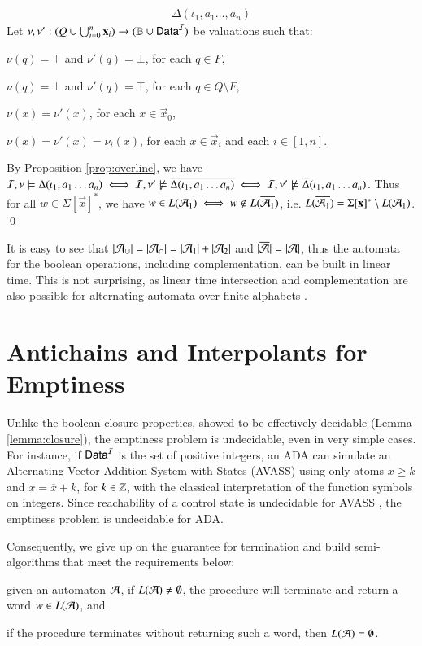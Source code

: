 \documentclass[10pt,conference,letterpaper,twocolumn]{IEEEtran}
\begin{document}
{\[\begin{array}{lcl}
  \overline{\Delta(\iota_1,a_1\ldots,a_n)}
  \end{array}\]
  Let $\nu,\nu' : (Q \cup \bigcup_{i=0}^n\mathbf x_i) \rightarrow (\mathbb{B}
  \cup \mathsf{Data}^{\mathcal{I}})$ be valuations such that: \begin{compactitem}
  \item $\nu(q) = \top$ and $\nu'(q) = \bot$, for each $q \in F$, 
  \item $\nu(q) = \bot$ and $\nu'(q) = \top$, for each $q \in Q \setminus F$, 
  \item $\nu(x) = \nu'(x)$, for each $x \in \vec{x}_0$, 
  \item $\nu(x) = \nu'(x) = \nu_i(x)$, for each $x \in \vec{x}_i$ and each $i
    \in [1,n]$.
  \end{compactitem}
  By Proposition \ref{prop:overline}, we have $\mathcal{I},\nu \models
  \Delta(\iota_1,a_1 \ldots a_n) \iff \mathcal{I},\nu' \not\models
  \overline{\Delta(\iota_1,a_1 \ldots a_n)} \iff \mathcal{I},\nu' \not\models
  \overline{\Delta}(\iota_1,a_1 \ldots a_n)$. Thus for all $w \in
  \Sigma[\vec{x}]^*$, we have $w \in L(\mathcal{A}_1) \iff w \not\in
  L(\overline{\mathcal{A}_1})$, i.e. $L(\overline{\mathcal{A}_1}) = \Sigma[\mathbf x]^*
  \setminus L(\mathcal{A}_1)$. \qed}

It is easy to see that ${|{\mathcal{A}_\cup}|} = {|{\mathcal{A}_\cap}|} = {|{\mathcal{A}_1}|} +
{|{\mathcal{A}_2}|}$ and ${|{\overline{\mathcal{A}}}|} = {|{\mathcal{A}}|}$, thus the automata
for the boolean operations, including complementation, can be built in
linear time. This is not surprising, as linear time intersection and
complementation are also possible for alternating automata over finite
alphabets \cite{ChandraKozenStockmeyer81}.

\section{Antichains and Interpolants for Emptiness}

Unlike the boolean closure properties, showed to be effectively
decidable (Lemma \ref{lemma:closure}), the emptiness problem is
undecidable, even in very simple cases. For instance, if $\mathsf{Data}^{\mathcal{I}}$ is
the set of positive integers, an ADA can simulate an Alternating
Vector Addition System with States (AVASS) \cite{LazicSchmitz14} using
only atoms $x \geq k$ and $x = \overline{x} + k$, for $k \in {\bf \mathbb{Z}}$,
with the classical interpretation of the function symbols on
integers. Since reachability of a control state is undecidable for
AVASS \cite{LINCOLN92}, the emptiness problem is undecidable for ADA.

Consequently, we give up on the guarantee for termination and build
semi-algorithms that meet the requirements below: \begin{compactenum}[(i)]
\item given an automaton $\mathcal{A}$, if $L(\mathcal{A}) \neq\emptyset$, the procedure
  will terminate and return a word $w \in L(\mathcal{A})$, and
%
\item if the procedure terminates without returning such a word, then
  $L(\mathcal{A}) = \emptyset$.
\end{compactenum}
\end{document}
